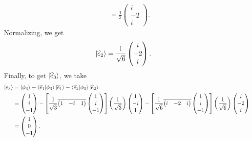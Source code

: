 \documentclass[10pt]{mypackage}
\begin{document}
\begin{example}
\begin{align*}
             &= \frac{1}{3} \begin{pmatrix}i\\-2\\i\end{pmatrix}.
 \end{align*}
 Normalizing, we get
 \begin{align*}
   \ket{\widehat{e}_2} &= \frac{1}{\sqrt{6}} \begin{pmatrix}i\\-2\\i\end{pmatrix}.
 \end{align*}
 Finally, to get $\ket{\widehat{e}_3}$, we take
 \begin{align*}
   \ket{e_3} &= \ket{\phi_3} - \braket{\widehat{e}_1}{\phi_3}\ket{\widehat{e}_1} - \braket{\widehat{e}_2}{\phi_3}\ket{\widehat{e}_2}\\
             &= \begin{pmatrix}1\\i\\-1\end{pmatrix} - \left[\frac{1}{\sqrt{3}} \overline{ \begin{pmatrix}1 & -i & 1\end{pmatrix} } \begin{pmatrix}1\\i\\-1\end{pmatrix}\right] \left(\frac{1}{\sqrt{3}}\right) \begin{pmatrix}1\\-i\\1\end{pmatrix} - \left[\frac{1}{\sqrt{6}} \overline{ \begin{pmatrix}i & -2 & i\end{pmatrix} } \begin{pmatrix}1\\i\\-1\end{pmatrix}\right] \left(\frac{1}{\sqrt{6}}\right) \begin{pmatrix}i\\-2\\i\end{pmatrix}\\
             &= \begin{pmatrix}1\\0\\-1\end{pmatrix}.
 \end{align*}

\end{example}
\end{document}
